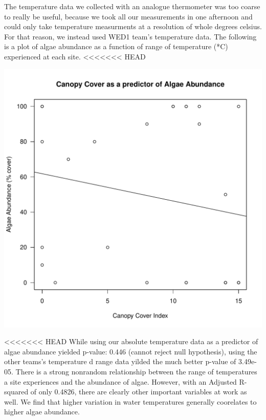 \documentclass{article}
\begin{document}
The temperature data we collected with an analogue thermometer was too coarse to really be useful, because we took all our measurements in one afternoon and could only take temperature measurments at a resolution of whole degrees celsius. For that reason, we instead used WED1 team's temperature data. The following is a plot of algae abundance as a function of range of temperature (*C) experienced at each site. 
<<<<<<< HEAD
\begin{knitrout}
\color{fgcolor}
\includegraphics[width=\maxwidth]{figure/unnamed-chunk-2-1} 

\end{knitrout}
<<<<<<< HEAD
While using our absolute temperature data as a predictor of algae abundance yielded p-value: 0.446 (cannot reject null hypothesis), using the other teams's temperature d range data yilded the much better p-value of 3.49e-05. There is a strong nonrandom relationship between the range of temperatures a site experiences and the abundance of algae. However, with an Adjusted R-squared of only 0.4826, there are clearly other important variables at work as well. We find that higher variation in water temperatures generally coorelates to higher algae abundance. 
\end{document}
